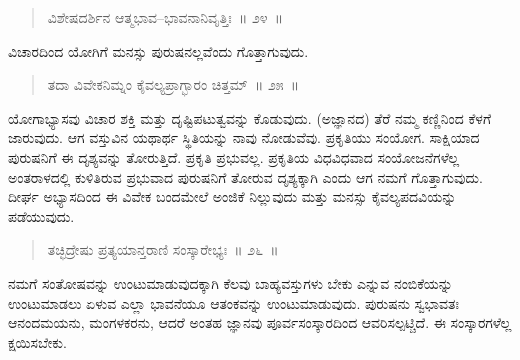 \vspace{-0.2cm}

\begin{verse}
ವಿಶೇಷದರ್ಶಿನ ಆತ್ಮಭಾವ–ಭಾವನಾನಿವೃತ್ತಿಃ~॥ ೨೪~॥
\end{verse}

\vspace{-0.38cm}


\vspace{0.2cm}

ವಿಚಾರದಿಂದ ಯೋಗಿಗೆ ಮನಸ್ಸು ಪುರುಷನಲ್ಲವೆಂದು ಗೊತ್ತಾಗುವುದು. 

\vspace{-0.2cm}

\begin{verse}
ತದಾ ವಿವೇಕನಿಮ್ನಂ ಕೈವಲ್ಯಪ್ರಾಗ್ಭಾರಂ ಚಿತ್ತಮ್​~॥ ೨೫~॥
\end{verse}

\vspace{-0.34cm}


\vspace{0.1cm}

ಯೋಗಾಭ್ಯಾಸವು ವಿಚಾರ ಶಕ್ತಿ ಮತ್ತು ದೃಷ್ಟಿಪಟುತ್ವವನ್ನು ಕೊಡುವುದು. (ಅಜ್ಞಾನದ) ತೆರೆ ನಮ್ಮ ಕಣ್ಣಿನಿಂದ ಕೆಳಗೆ ಜಾರುವುದು. ಆಗ ವಸ್ತುವಿನ ಯಥಾರ್ಥ ಸ್ಥಿತಿಯನ್ನು ನಾವು ನೋಡುವೆವು. ಪ್ರಕೃತಿಯು ಸಂಯೋಗ. ಸಾಕ್ಷಿಯಾದ ಪುರುಷನಿಗೆ ಈ ದೃಶ್ಯವನ್ನು ತೋರುತ್ತಿದೆ. ಪ್ರಕೃತಿ ಪ್ರಭುವಲ್ಲ. ಪ್ರಕೃತಿಯ ವಿಧವಿಧವಾದ ಸಂಯೋಜನೆಗಳೆಲ್ಲ ಅಂತರಾಳದಲ್ಲಿ ಕುಳಿತಿರುವ ಪ್ರಭುವಾದ ಪುರುಷನಿಗೆ ತೋರುವ ದೃಶ್ಯಕ್ಕಾಗಿ ಎಂದು ಆಗ ನಮಗೆ ಗೊತ್ತಾಗುವುದು. ದೀರ್ಘ ಅಭ್ಯಾಸದಿಂದ ಈ ವಿವೇಕ ಬಂದಮೇಲೆ ಅಂಜಿಕೆ ನಿಲ್ಲುವುದು ಮತ್ತು ಮನಸ್ಸು ಕೈವಲ್ಯಪದವಿಯನ್ನು ಪಡೆಯುವುದು. 

\vspace{-0.25cm}

\begin{verse}
ತಚ್ಛಿದ್ರೇಷು ಪ್ರತ್ಯಯಾನ್ತರಾಣಿ ಸಂಸ್ಕಾರೇಭ್ಯಃ~॥ ೨೬~॥
\end{verse}

\vspace{-0.3cm}


\vspace{0.1cm}

ನಮಗೆ ಸಂತೋಷವನ್ನು ಉಂಟುಮಾಡುವುದಕ್ಕಾಗಿ ಕೆಲವು ಬಾಹ್ಯವಸ್ತುಗಳು ಬೇಕು ಎನ್ನುವ ನಂಬಿಕೆಯನ್ನು ಉಂಟುಮಾಡಲು ಏಳುವ ಎಲ್ಲಾ ಭಾವನೆಯೂ ಆತಂಕವನ್ನು ಉಂಟುಮಾಡುವುದು. ಪುರುಷನು ಸ್ವಭಾವತಃ ಆನಂದಮಯನು, ಮಂಗಳಕರನು, ಆದರೆ ಅಂತಹ ಜ್ಞಾನವು ಪೂರ್ವಸಂಸ್ಕಾರದಿಂದ ಆವರಿಸಲ್ಪಟ್ಚಿದೆ. ಈ ಸಂಸ್ಕಾರಗಳೆಲ್ಲ ಕ್ಷಯಿಸಬೇಕು. 

